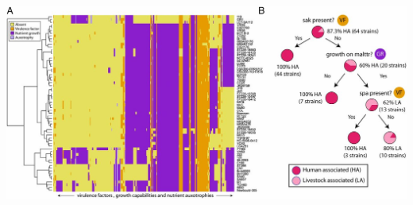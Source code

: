 \begin{frame}
\begin{columns}[c]
        \includegraphics[width=\textwidth]{images/palsson02}
    \end{columns}  
\end{frame}